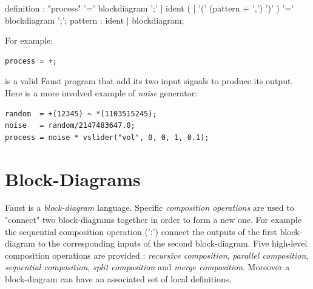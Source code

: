 \documentclass{article}
\begin{document}
\begin{rail}
definition  : "process" '=' blockdiagram ';'
      | ident (  | '(' (pattern + ',') ')' ) '=' blockdiagram ';';
pattern : ident | blockdiagram;
\end{rail}

%


For example: 

\begin{lstlisting}
process = +;
\end{lstlisting}

is a valid Faust program that add its two input signals to produce its output. Here is a more involved example of \emph{noise} generator:

\begin{lstlisting}
random  = +(12345) ~ *(1103515245);
noise   = random/2147483647.0;
process = noise * vslider("vol", 0, 0, 1, 0.1);
\end{lstlisting}


\section{Block-Diagrams}

Faust is a \emph{block-diagram} language. Specific \emph{composition operations} are used to "connect" two block-diagrams together in order to form a new one.  For example the sequential composition operation (':') connect the outputs of the first block-diagram to the corresponding inputs of the second block-diagram. Five high-level composition operations are provided : \emph{recursive composition}, \emph{parallel composition}, \emph{sequential composition}, \emph{split composition} and \emph{merge composition}. Moreover a block-diagram can have an associated set of local definitions.

\vspace{5 mm}
\end{document}
